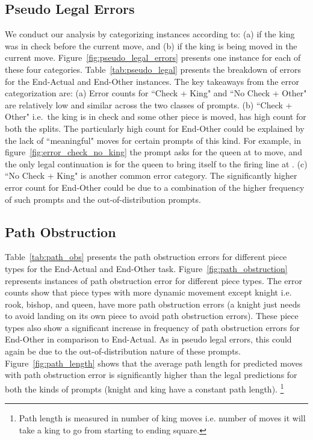 \subsection{Pseudo Legal Errors}
\label{sec:pseudo_legal}
We conduct our analysis by categorizing instances according to: (a) if the king was in check before the current move, and (b) if the king is being moved in the current move. 
Figure~\ref{fig:pseudo_legal_errors} presents one instance for each of these four categories.
Table~\ref{tab:pseudo_legal} presents the breakdown of errors for the End-Actual and End-Other instances. The key takeaways from the error categorization are: (a) Error counts for ``Check + King" and ``No Check + Other" are relatively low and similar across the two classes of prompts. (b) ``Check + Other" i.e.\ the king is in check and some other piece is moved, has high count for both the splits. The particularly high count for End-Other could be explained by the lack of ``meaningful" moves for certain prompts of this kind. For example, in figure~\ref{fig:error_check_no_king} the prompt asks for the queen at  to move, and the only legal continuation is for the queen to bring itself to the firing line at . (c) ``No Check + King"  is another common error category. 
The significantly higher error count for End-Other could be due to a combination of the higher frequency of such prompts and the out-of-distribution prompts.
 




\subsection{Path Obstruction}
Table~\ref{tab:path_obs} presents the path obstruction errors for different piece types for the End-Actual and End-Other task. Figure~\ref{fig:path_obstruction} represents instances of path obstruction error for different piece types.  
The error counts show that piece types with more dynamic movement except knight i.e. rook, bishop, and queen, have more path obstruction errors  (a knight just needs to avoid landing on its own piece to avoid path obstruction errors). 
These piece types also show a significant increase in frequency of path obstruction errors for End-Other in comparison to End-Actual. As in pseudo legal errors, this could again be due to the out-of-distribution nature of these prompts. Figure~\ref{fig:path_length} shows that the average path length for predicted moves with path obstruction error is significantly higher than the legal predictions for both the kinds of prompts (knight and king have a constant path length). \footnote{Path length is measured in number of king moves i.e. number of moves it will take a king to go from starting to ending square.}
